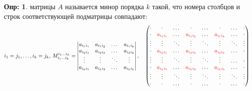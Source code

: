 \documentclass[12pt]{article}
\theoremstyle{definition}
\newtheorem{defn}{Опр:}
\begin{document}
\begin{defn}
	 матрицы $A$ называется минор порядка $k$ такой, что номера столбцов и строк соответствующей подматрицы совпадают: 
	$$
		i_1 = j_1, \dotsc, i_k = j_k, \, M_{i_1\dotsc i_k}^{i_1\dotsc i_k} = 	\begin{vmatrix}
			a_{i_1 i_1} & a_{i_1 i_2} & \dotsc & a_{i_1 i_k}\\
			a_{i_2 i_1} & a_{i_2 i_2} & \dotsc & a_{i_2 i_k}\\
			\vdots & \vdots & \ddots & \vdots\\
			a_{i_k i_1} & a_{i_k i_2} & \dotsc & a_{i_k i_k}\\
		\end{vmatrix} , \quad
		\begin{pmatrix}
			\cdot & \cdot & \dotsc & \cdot & \dotsc & \cdot& \dotsc & \cdot\\
			\cdot & \color{red}a_{i_1 i_1} & \dotsc & \color{red}a_{i_1 i_2} & \dotsc & \color{red}a_{i_1 i_k} & \dotsc & \cdot\\
			\vdots & \vdots & \ddots & \vdots & \ddots & \vdots& \ddots & \vdots\\
			\cdot & \color{red}a_{i_2 i_1} & \dotsc & \color{red}a_{i_2 i_2} & \dotsc & \color{red}a_{i_2 i_k} & \dots & \cdot\\
			\vdots & \vdots & \ddots & \vdots & \ddots & \vdots& \dotsc & \cdot\\
			\cdot & \color{red}a_{i_k i_1} & \dotsc & \color{red}a_{i_k i_2} & \dotsc & \color{red}a_{i_k i_k} & \dotsc & \cdot\\
			\vdots & \vdots & \ddots & \vdots & \ddots & \vdots& \ddots & \vdots\\
			\cdot & \cdot & \dotsc & \cdot & \dotsc & \cdot & \dotsc & \cdot
		\end{pmatrix}
	$$
\end{defn}
\end{document}

